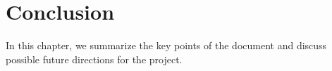 \chapter{Conclusion}

In this chapter, we summarize the key points of the document and discuss possible future directions for the project.
